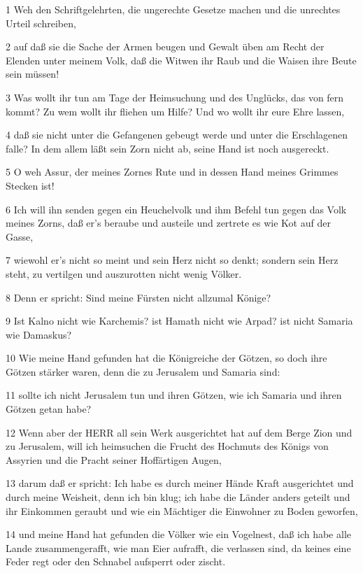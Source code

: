 \par 1 Weh den Schriftgelehrten, die ungerechte Gesetze machen und die unrechtes Urteil schreiben,
\par 2 auf daß sie die Sache der Armen beugen und Gewalt üben am Recht der Elenden unter meinem Volk, daß die Witwen ihr Raub und die Waisen ihre Beute sein müssen!
\par 3 Was wollt ihr tun am Tage der Heimsuchung und des Unglücks, das von fern kommt? Zu wem wollt ihr fliehen um Hilfe? Und wo wollt ihr eure Ehre lassen,
\par 4 daß sie nicht unter die Gefangenen gebeugt werde und unter die Erschlagenen falle? In dem allem läßt sein Zorn nicht ab, seine Hand ist noch ausgereckt.
\par 5 O weh Assur, der meines Zornes Rute und in dessen Hand meines Grimmes Stecken ist!
\par 6 Ich will ihn senden gegen ein Heuchelvolk und ihm Befehl tun gegen das Volk meines Zorns, daß er's beraube und austeile und zertrete es wie Kot auf der Gasse,
\par 7 wiewohl er's nicht so meint und sein Herz nicht so denkt; sondern sein Herz steht, zu vertilgen und auszurotten nicht wenig Völker.
\par 8 Denn er spricht: Sind meine Fürsten nicht allzumal Könige?
\par 9 Ist Kalno nicht wie Karchemis? ist Hamath nicht wie Arpad? ist nicht Samaria wie Damaskus?
\par 10 Wie meine Hand gefunden hat die Königreiche der Götzen, so doch ihre Götzen stärker waren, denn die zu Jerusalem und Samaria sind:
\par 11 sollte ich nicht Jerusalem tun und ihren Götzen, wie ich Samaria und ihren Götzen getan habe?
\par 12 Wenn aber der HERR all sein Werk ausgerichtet hat auf dem Berge Zion und zu Jerusalem, will ich heimsuchen die Frucht des Hochmuts des Königs von Assyrien und die Pracht seiner Hoffärtigen Augen,
\par 13 darum daß er spricht: Ich habe es durch meiner Hände Kraft ausgerichtet und durch meine Weisheit, denn ich bin klug; ich habe die Länder anders geteilt und ihr Einkommen geraubt und wie ein Mächtiger die Einwohner zu Boden geworfen,
\par 14 und meine Hand hat gefunden die Völker wie ein Vogelnest, daß ich habe alle Lande zusammengerafft, wie man Eier aufrafft, die verlassen sind, da keines eine Feder regt oder den Schnabel aufsperrt oder zischt.
